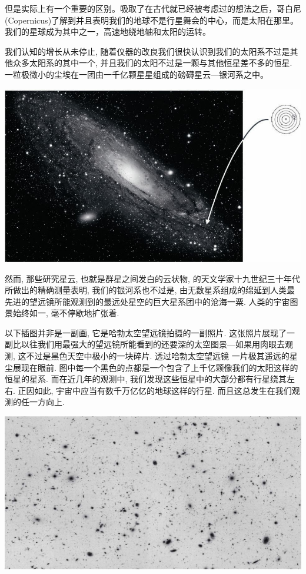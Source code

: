    但是实际上有一个重要的区别。吸取了在古代就已经被考虑过的想法之后，哥白尼(Copernicus)了解到并且表明我们的地球不是行星舞会的中心，而是太阳在那里。我们的星球成为其中之一，高速地绕地轴和太阳的运转。

   我们认知的增长从未停止, 随着仪器的改良我们很快认识到我们的太阳系不过是其他众多太阳系的其中一个, 并且我们的太阳不过是一颗与其他恒星差不多的恒星. 一粒极微小的尘埃在一团由一千亿颗星星组成的磅礴星云---银河系之中。

	\bc
	\includegraphics[width=.9\textwidth]{img/35.jpg}\\[12pt]
	\ec

   然而, 那些研究星云, 也就是群星之间发白的云状物, 的天文学家十九世纪三十年代所做出的精确测量表明, 我们的银河系也不过是, 由无数星系组成的绵延到人类最先进的望远镜所能观测到的最远处星空的巨大星系团中的沧海一粟. 人类的宇宙图景始终如一, 毫不停歇地扩张着. 

   以下插图并非是一副画, 它是哈勃太空望远镜拍摄的一副照片. 这张照片展现了一副比以往我们用最强大的望远镜所能看到的还要深的太空图景---如果用肉眼去观测, 这不过是黑色天空中极小的一块碎片. 透过哈勃太空望远镜 一片极其遥远的星尘展现在眼前. 图中每一个黑色的点都是一个包含了上千亿颗像我们的太阳这样的恒星的星系. 而在近几年的观测中, 我们发现这些恒星中的大部分都有行星绕其左右. 正因如此, 宇宙中应当有数千万亿亿的地球这样的行星. 而且这总发生在我们观测的任一方向上.

	\bc
	\includegraphics[width=.9\textwidth]{img/36.jpg}\\[12pt]
	\ec	
    

